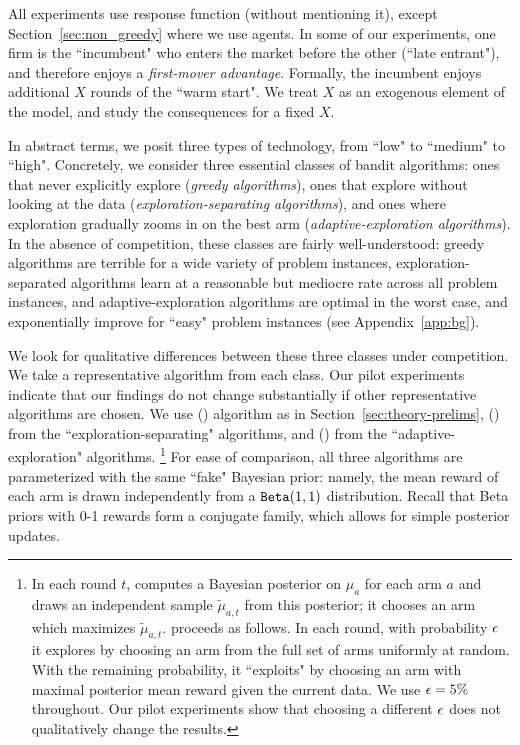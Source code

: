 \documentclass[../competing_bandits.tex]{subfiles}
\begin{document}
 All experiments use \HardMax response function (without mentioning it), except Section~\ref{sec:non_greedy} where we use \HardMaxRandom agents. In some of our experiments, one firm is the ``incumbent" who enters the market before the other (``late entrant"), and therefore enjoys a \emph{first-mover advantage}. Formally, the incumbent enjoys additional $X$ rounds of the ``warm start". We treat $X$ as an exogenous element of the model, and study the consequences for a fixed $X$.

 In abstract terms, we posit three types of technology, from ``low" to ``medium" to ``high". Concretely, we consider three essential classes of bandit algorithms: ones that never explicitly explore (\emph{greedy algorithms}), ones that explore without looking at the data (\emph{exploration-separating algorithms}), and ones where exploration gradually zooms in on the best arm (\emph{adaptive-exploration algorithms}). In the absence of competition, these classes are fairly well-understood: greedy algorithms are terrible for a wide variety of problem instances, exploration-separated algorithms learn at a reasonable but mediocre rate across all problem instances, and adaptive-exploration algorithms are optimal in the worst case, and exponentially improve for ``easy" problem instances (see Appendix~\ref{app:bg}).

We look for qualitative differences between these three classes under competition. We take a representative algorithm from each class. Our pilot experiments indicate that our findings do not change substantially if other representative algorithms are chosen. We use
\DynGreedy (\DG) algorithm  as in Section~\ref{sec:theory-prelims},
\DynamicEpsGreedy (\DEG) from the ``exploration-separating" algorithms,
and \Thompson (\TS) from the ``adaptive-exploration" algorithms.%
\footnote{In each round $t$, \Thompson computes a Bayesian posterior on $\mu_a$ for each arm $a$ and draws an independent sample $\tilde{\mu}_{a,t}$ from this posterior; it chooses an arm which maximizes $\tilde{\mu}_{a,t}$.
    \newline\indent
\DynamicEpsGreedy proceeds as follows. In each round, with probability $\epsilon$ it explores by choosing an arm from the full set of arms uniformly at random. With the remaining probability, it ``exploits" by choosing an arm with maximal posterior mean reward given the current data. We use $\epsilon=5\%$ throughout. Our pilot experiments show that choosing a different $\epsilon$ does not qualitatively change the results.}
For ease of comparison, all three algorithms are parameterized with the same ``fake" Bayesian prior: namely, the mean reward of each arm is drawn independently from a $\mathtt{Beta}(1,1)$ distribution. Recall that Beta priors with 0-1 rewards form a conjugate family, which allows for simple posterior updates.
\end{document}
